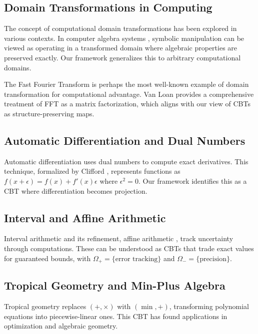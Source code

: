\documentclass[12pt,a4paper]{article}
\theoremstyle{definition}
\begin{document}
\subsection{Domain Transformations in Computing}

The concept of computational domain transformations has been explored in various contexts. In computer algebra systems \cite{cohen2003computer}, symbolic manipulation can be viewed as operating in a transformed domain where algebraic properties are preserved exactly. Our framework generalizes this to arbitrary computational domains.

The Fast Fourier Transform \cite{cooley1965algorithm} is perhaps the most well-known example of domain transformation for computational advantage. Van Loan \cite{van1992computational} provides a comprehensive treatment of FFT as a matrix factorization, which aligns with our view of CBTs as structure-preserving maps.

\subsection{Automatic Differentiation and Dual Numbers}

Automatic differentiation \cite{griewank2008evaluating} uses dual numbers to compute exact derivatives. This technique, formalized by Clifford \cite{clifford1873preliminary}, represents functions as $f(x + \epsilon) = f(x) + f'(x)\epsilon$ where $\epsilon^2 = 0$. Our framework identifies this as a CBT where differentiation becomes projection.

\subsection{Interval and Affine Arithmetic}

Interval arithmetic \cite{moore1966interval} and its refinement, affine arithmetic \cite{de2004affine}, track uncertainty through computations. These can be understood as CBTs that trade exact values for guaranteed bounds, with $\Omega_+ = \{\text{error tracking}\}$ and $\Omega_- = \{\text{precision}\}$.

\subsection{Tropical Geometry and Min-Plus Algebra}

Tropical geometry \cite{maclagan2015introduction} replaces $(+, \times)$ with $(\min, +)$, transforming polynomial equations into piecewise-linear ones. This CBT has found applications in optimization \cite{butkovivc2010max} and algebraic geometry.
\end{document}
